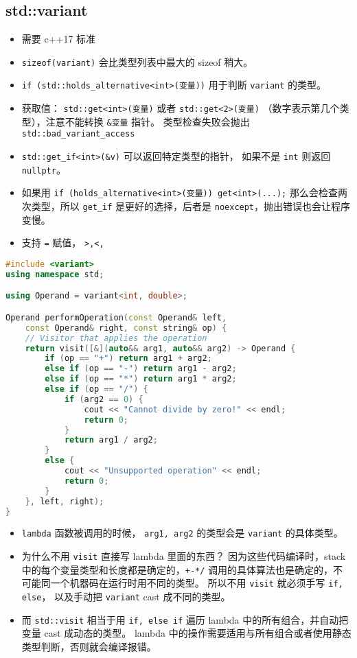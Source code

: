 \subsection{std::variant}
\begin{itemize}
\item 需要 c++17 标准
\item \verb|sizeof(variant)| 会比类型列表中最大的 sizeof 稍大。
\item \verb|if (std::holds_alternative<int>(变量))| 用于判断 \verb|variant| 的类型。
\item 获取值： \verb|std::get<int>(变量)| 或者 \verb|std::get<2>(变量)| （数字表示第几个类型），注意不能转换 \verb|&变量| 指针。 类型检查失败会抛出 \verb|std::bad_variant_access|
\item \verb|std::get_if<int>(&v)| 可以返回特定类型的指针， 如果不是 \verb|int| 则返回 \verb|nullptr|。
\item 如果用 \verb|if (holds_alternative<int>(变量)) get<int>(...);| 那么会检查两次类型，所以 \verb|get_if| 是更好的选择，后者是 \verb|noexcept|，抛出错误也会让程序变慢。
\item 支持 \verb|=| 赋值， \verb|>,<,|
\end{itemize}
\begin{lstlisting}[language=cpp]
#include <variant>
using namespace std;

using Operand = variant<int, double>;

Operand performOperation(const Operand& left,
    const Operand& right, const string& op) {
    // Visitor that applies the operation
    return visit([&](auto&& arg1, auto&& arg2) -> Operand {
        if (op == "+") return arg1 + arg2;
        else if (op == "-") return arg1 - arg2;
        else if (op == "*") return arg1 * arg2;
        else if (op == "/") {
            if (arg2 == 0) {
                cout << "Cannot divide by zero!" << endl;
                return 0;
            }
            return arg1 / arg2;
        }
        else {
            cout << "Unsupported operation" << endl;
            return 0;
        }
    }, left, right);
}
\end{lstlisting}
\begin{itemize}
\item \verb|lambda| 函数被调用的时候， \verb|arg1, arg2| 的类型会是 \verb|variant| 的具体类型。
\item 为什么不用 \verb`visit` 直接写 lambda 里面的东西？ 因为这些代码编译时，stack 中的每个变量类型和长度都是确定的，\verb|+-*/| 调用的具体算法也是确定的，不可能同一个机器码在运行时用不同的类型。 所以不用 \verb|visit| 就必须手写 \verb|if, else|， 以及手动把 \verb|variant| cast 成不同的类型。
\item 而 \verb|std::visit| 相当于用 \verb|if, else if| 遍历 lambda 中的所有组合，并自动把变量 cast 成动态的类型。 lambda 中的操作需要适用与所有组合或者使用静态类型判断，否则就会编译报错。
\end{itemize}


